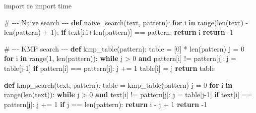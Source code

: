 \documentclass[
  letterpaper,
  DIV=11,
  numbers=noendperiod]{scrreprt}
\newenvironment{Shaded}{\begin{snugshade}}{\end{snugshade}}
\newcommand{\BuiltInTok}[1]{\textcolor[rgb]{0.00,0.23,0.31}{#1}}
\newcommand{\CommentTok}[1]{\textcolor[rgb]{0.37,0.37,0.37}{#1}}
\newcommand{\ControlFlowTok}[1]{\textcolor[rgb]{0.00,0.23,0.31}{\textbf{#1}}}
\newcommand{\DecValTok}[1]{\textcolor[rgb]{0.68,0.00,0.00}{#1}}
\newcommand{\ImportTok}[1]{\textcolor[rgb]{0.00,0.46,0.62}{#1}}
\newcommand{\KeywordTok}[1]{\textcolor[rgb]{0.00,0.23,0.31}{\textbf{#1}}}
\newcommand{\NormalTok}[1]{\textcolor[rgb]{0.00,0.23,0.31}{#1}}
\newcommand{\OperatorTok}[1]{\textcolor[rgb]{0.37,0.37,0.37}{#1}}
\begin{document}
\begin{Shaded}
\begin{Highlighting}[]
\ImportTok{import}\NormalTok{ re}
\ImportTok{import}\NormalTok{ time}

\CommentTok{\# {-}{-}{-} Naive search {-}{-}{-}}
\KeywordTok{def}\NormalTok{ naive\_search(text, pattern):}
    \ControlFlowTok{for}\NormalTok{ i }\KeywordTok{in} \BuiltInTok{range}\NormalTok{(}\BuiltInTok{len}\NormalTok{(text) }\OperatorTok{{-}} \BuiltInTok{len}\NormalTok{(pattern) }\OperatorTok{+} \DecValTok{1}\NormalTok{):}
        \ControlFlowTok{if}\NormalTok{ text[i:i}\OperatorTok{+}\BuiltInTok{len}\NormalTok{(pattern)] }\OperatorTok{==}\NormalTok{ pattern:}
            \ControlFlowTok{return}\NormalTok{ i}
    \ControlFlowTok{return} \OperatorTok{{-}}\DecValTok{1}

\CommentTok{\# {-}{-}{-} KMP search {-}{-}{-}}
\KeywordTok{def}\NormalTok{ kmp\_table(pattern):}
\NormalTok{    table }\OperatorTok{=}\NormalTok{ [}\DecValTok{0}\NormalTok{] }\OperatorTok{*} \BuiltInTok{len}\NormalTok{(pattern)}
\NormalTok{    j }\OperatorTok{=} \DecValTok{0}
    \ControlFlowTok{for}\NormalTok{ i }\KeywordTok{in} \BuiltInTok{range}\NormalTok{(}\DecValTok{1}\NormalTok{, }\BuiltInTok{len}\NormalTok{(pattern)):}
        \ControlFlowTok{while}\NormalTok{ j }\OperatorTok{\textgreater{}} \DecValTok{0} \KeywordTok{and}\NormalTok{ pattern[i] }\OperatorTok{!=}\NormalTok{ pattern[j]:}
\NormalTok{            j }\OperatorTok{=}\NormalTok{ table[j}\OperatorTok{{-}}\DecValTok{1}\NormalTok{]}
        \ControlFlowTok{if}\NormalTok{ pattern[i] }\OperatorTok{==}\NormalTok{ pattern[j]:}
\NormalTok{            j }\OperatorTok{+=} \DecValTok{1}
\NormalTok{            table[i] }\OperatorTok{=}\NormalTok{ j}
    \ControlFlowTok{return}\NormalTok{ table}

\KeywordTok{def}\NormalTok{ kmp\_search(text, pattern):}
\NormalTok{    table }\OperatorTok{=}\NormalTok{ kmp\_table(pattern)}
\NormalTok{    j }\OperatorTok{=} \DecValTok{0}
    \ControlFlowTok{for}\NormalTok{ i }\KeywordTok{in} \BuiltInTok{range}\NormalTok{(}\BuiltInTok{len}\NormalTok{(text)):}
        \ControlFlowTok{while}\NormalTok{ j }\OperatorTok{\textgreater{}} \DecValTok{0} \KeywordTok{and}\NormalTok{ text[i] }\OperatorTok{!=}\NormalTok{ pattern[j]:}
\NormalTok{            j }\OperatorTok{=}\NormalTok{ table[j}\OperatorTok{{-}}\DecValTok{1}\NormalTok{]}
        \ControlFlowTok{if}\NormalTok{ text[i] }\OperatorTok{==}\NormalTok{ pattern[j]:}
\NormalTok{            j }\OperatorTok{+=} \DecValTok{1}
        \ControlFlowTok{if}\NormalTok{ j }\OperatorTok{==} \BuiltInTok{len}\NormalTok{(pattern):}
            \ControlFlowTok{return}\NormalTok{ i }\OperatorTok{{-}}\NormalTok{ j }\OperatorTok{+} \DecValTok{1}
    \ControlFlowTok{return} \OperatorTok{{-}}\DecValTok{1}


\end{Highlighting}
\end{Shaded}
\end{document}
